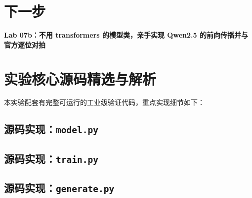 \section{下一步}

{}\textbf{Lab 07b：不用 transformers 的模型类，亲手实现 Qwen2.5 的前向传播并与官方逐位对拍}


\section{实验核心源码精选与解析}

本实验配套有完整可运行的工业级验证代码，重点实现细节如下：


\subsection{源码实现：\texttt{model.py}}




\subsection{源码实现：\texttt{train.py}}




\subsection{源码实现：\texttt{generate.py}}



